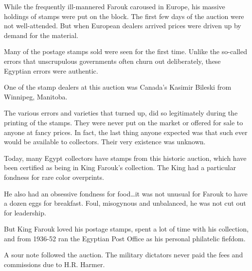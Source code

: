 \documentclass[justified]{tufte-book}
\begin{document}
While the frequently ill-mannered Farouk caroused in Europe, his massive holdings of stamps were put on the block.  The first few days of the auction were not well-attended.  But when European dealers arrived prices were driven up by demand for the material.

Many of the postage stamps sold were seen for the first time.  Unlike the so-called errors that unscrupulous governments often churn out deliberately, these Egyptian errors were authentic.

One of the stamp dealers at this auction was Canada’s Kasimir Bileski from Winnipeg, Manitoba.

The various errors and varieties that turned up, did so legitimately during the printing of the stamps.  They were never put on the market or offered for sale to anyone at fancy prices.  In fact, the last thing anyone expected was that such ever would be available to collectors.  Their very existence was unknown.

Today, many Egypt collectors have stamps from this historic auction, which have been certified as being in King Farouk’s collection.  The King had a particular fondness for rare color overprints.

He also had an obsessive fondness for food\ldots it was not unusual for Farouk to have a dozen eggs for breakfast.  Foul, misogynous and unbalanced, he was not cut out for leadership.

But King Farouk loved his postage stamps, spent a lot of time with his collection, and from 1936-52 ran the Egyptian Post Office as his personal philatelic fiefdom.

A sour note followed the auction.  The military dictators never paid the fees and commissions due to H.R. Harmer.
\end{document}
